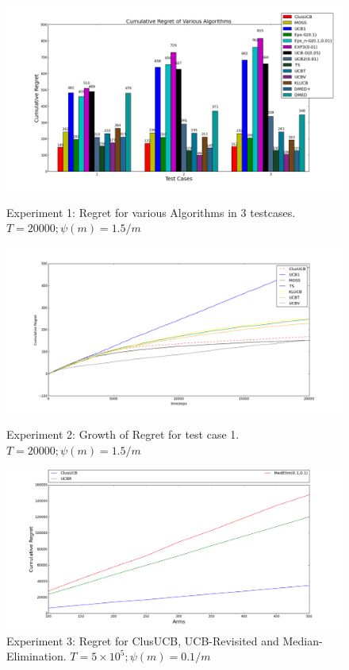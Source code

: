 \begin{figure}[!tbp]
\centering
\begin{minipage}[b]{0.4\textwidth}
\includegraphics[width=\textwidth]{img/cl_final12.png}
\caption{Experiment 1: Regret for various Algorithms in 3 testcases. $T=20000; \psi(m)=1.5/m$}
\end{minipage}
\hspace{0.1em}
\begin{minipage}[b]{0.4\textwidth}
\includegraphics[width=\textwidth]{img/cl_final2.png}
\caption{Experiment 2: Growth of Regret for test case 1. $T=20000; \psi(m)=1.5/m$}
\end{minipage}
\hspace{0.1em}
\begin{minipage}[b]{0.4\textwidth}
\includegraphics[width=\textwidth]{img/cl_final3.png}
\caption{Experiment 3: Regret for ClusUCB, UCB-Revisited and Median-Elimination. $T=5\times10^5; \psi(m)=0.1/m$}
\end{minipage}
\hspace{0.1em}
\end{figure}

